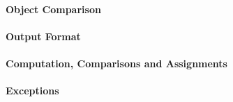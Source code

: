 \paragraph{Object Comparison}
\begin{itemize}
\end{itemize}

\paragraph{Output Format}
\begin{itemize}
\end{itemize}

\paragraph{Computation, Comparisons and Assignments}
\begin{itemize}
\end{itemize}

\paragraph{Exceptions}
\begin{itemize}
\end{itemize}

